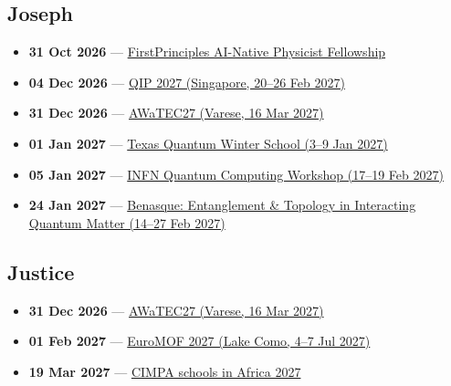 \subsection*{Joseph}
\begin{itemize}[leftmargin=1.4em,itemsep=0.1em]
  \item \textbf{31 Oct 2026} --- \href{https://www.firstprinciplesfoundation.org/programs}{FirstPrinciples AI-Native Physicist Fellowship}
  \item \textbf{04 Dec 2026} --- \href{https://qipconference.org/2027/call/}{QIP 2027 (Singapore, 20--26 Feb 2027)}
  \item \textbf{31 Dec 2026} --- \href{https://awatec27.dista.uninsubria.it/}{AWaTEC27 (Varese, 16 Mar 2027)}
  \item \textbf{01 Jan 2027} --- \href{https://www.texquantum.com/index.html}{Texas Quantum Winter School (3--9 Jan 2027)}
  \item \textbf{05 Jan 2027} --- \href{https://agenda.infn.it/event/53380/abstracts/}{INFN Quantum Computing Workshop (17--19 Feb 2027)}
  \item \textbf{24 Jan 2027} --- \href{https://www.benasque.org/2027etqm/}{Benasque: Entanglement \& Topology in Interacting Quantum Matter (14--27 Feb 2027)}
\end{itemize}

\subsection*{Justice}
\begin{itemize}[leftmargin=1.4em,itemsep=0.1em]
  \item \textbf{31 Dec 2026} --- \href{https://awatec27.dista.uninsubria.it/}{AWaTEC27 (Varese, 16 Mar 2027)}
  \item \textbf{01 Feb 2027} --- \href{https://euromof2027.com/}{EuroMOF 2027 (Lake Como, 4--7 Jul 2027)}
  \item \textbf{19 Mar 2027} --- \href{https://www.cimpa.info/}{CIMPA schools in Africa 2027}
\end{itemize}

